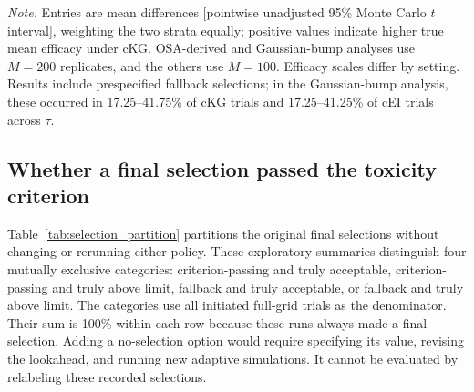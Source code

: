 \documentclass[11pt]{article}
\newcommand{\rev}[1]{{#1}}
\begin{document}
\begin{table}[H]
\centering
\scriptsize
\caption{cKG-minus-cEI differences in true mean efficacy at final selection, by $\tau$, under full-grid availability.}
\label{tab:ckg_cei_efficacy_tau}
\setlength{\tabcolsep}{3.5pt}
\vspace{3pt}
\begin{minipage}{0.98\linewidth}
\scriptsize\raggedright
\textit{Note.} Entries are mean differences [pointwise unadjusted 95\% Monte Carlo $t$ interval], weighting the two strata equally; positive values indicate higher true mean efficacy under cKG. OSA-derived and Gaussian-bump analyses use $M=200$ replicates, and the others use $M=100$. Efficacy scales differ by setting. Results include prespecified fallback selections; in the Gaussian-bump analysis, these occurred in 17.25--41.75\% of cKG trials and 17.25--41.25\% of cEI trials across $\tau$.
\end{minipage}
\end{table}

\subsection{Whether a final selection passed the toxicity criterion}\label{sec:selection_partition}

Table~\ref{tab:selection_partition} partitions the original final selections without changing or rerunning either policy. These exploratory summaries distinguish four mutually exclusive categories: criterion-passing and truly acceptable, criterion-passing and truly above limit, fallback and truly acceptable, or fallback and truly above limit. The categories use all initiated full-grid trials as the denominator. Their sum is 100\% within each row because these runs always made a final selection. \rev{Adding a no-selection option would require specifying its value, revising the lookahead, and running new adaptive simulations. It cannot be evaluated by relabeling these recorded selections.}
\end{document}

